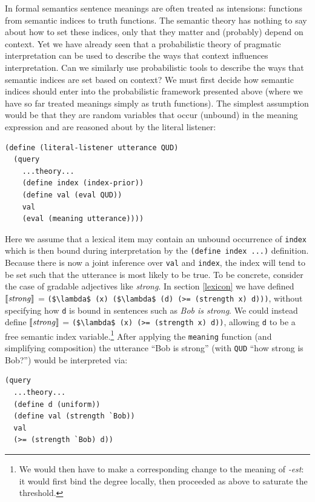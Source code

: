 \documentclass[pdfextras]{handbook}
\newcommand{\llbracket}{\ensuremath{\left [\!\left [}}%
\newcommand{\rrbracket}{\ensuremath{\right ]\!\right ]}}
\providecommand{\sv}[1]{\ensuremath{\llbracket \mathit{#1} \rrbracket}}
\begin{document}
In formal semantics \citep{lewis70,montague1973} sentence meanings are often treated as intensions: functions from semantic indices to truth functions. The semantic theory has nothing to say about how to set these indices, only that they matter and (probably) depend on context. Yet we have already seen that a probabilistic theory of pragmatic interpretation can be used to describe the ways that context influences interpretation. Can we similarly use probabilistic tools to describe the ways that semantic indices are set based on context?
We must first decide how semantic indices should enter into the probabilistic framework presented above (where we have so far treated meanings simply as truth functions). The simplest assumption would be that they are random variables that occur (unbound) in the meaning expression and are reasoned about by the literal listener:
\begin{lstlisting}
(define (literal-listener utterance QUD)
  (query
    ...theory...
    (define index (index-prior))
    (define val (eval QUD))
    val
    (eval (meaning utterance))))
\end{lstlisting}
Here we assume that a lexical item may contain an unbound occurrence of \lstinline{index} which is then bound during interpretation by  the \lstinline{(define index ...)} definition.
Because there is now a joint inference over \lstinline{val} and \lstinline{index}, the index will tend to be set such that the utterance is most likely to be true. 
To be concrete, consider the case of gradable adjectives like \emph{strong}. In section \ref{lexicon} we have defined \sv{\mathit{strong}} = \lstinline[mathescape]{($\lambda$ (x) ($\lambda$ (d) (>= (strength x) d)))}, without specifying how \lstinline{d} is bound in sentences such as \emph{Bob is strong}.
We could instead define \sv{strong} = \lstinline[mathescape]{($\lambda$ (x) (>= (strength x) d))}, allowing \lstinline{d} to be a free semantic index variable.\footnote{We would then have to make a corresponding change
to the meaning of \emph{-est}: it would first bind the degree locally, then proceeded as above to saturate the threshold.}
 After applying the \lstinline{meaning} function (and simplifying composition) the utterance ``Bob is strong'' (with \lstinline{QUD} ``how strong is Bob?'') would be interpreted via:
\begin{lstlisting}
(query
  ...theory...
  (define d (uniform))
  (define val (strength `Bob))
  val
  (>= (strength `Bob) d))
\end{lstlisting}
\end{document}
